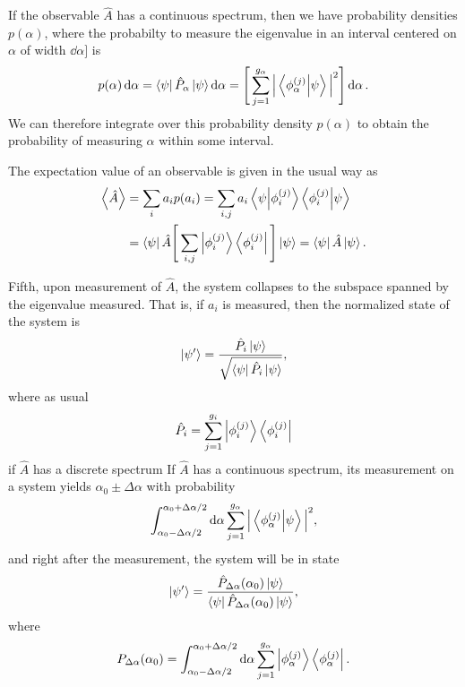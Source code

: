 If the observable $\hat{A}$ has a continuous spectrum, then we have probability densities $p(\alpha)$, where the probabilty to measure the eigenvalue in an interval centered on $\alpha$ of width $\dd{\alpha}]$ is 
\begin{align}
    p(\alpha) \dd{\alpha} = \bra{\psi} \hat{P}_{\alpha} \ket{\psi} \dd{\alpha} = \Bigg[ \sum_{j=1}^{g_{\alpha}} \Big| \bra{\phi_{\alpha}^{(j)}} \ket{\psi} \Big|^2 \Bigg] \dd{\alpha}
.\end{align}
We can therefore integrate over this probability density $p(\alpha)$ to obtain the probability of measuring $\alpha$ within some interval.

The expectation value of an observable is given in the usual way as
\begin{align}
    \expval{\hat{A}} &= \sum_{i} a_{i} p(a_{i}) = \sum_{i,j} a_{i} \bra{\psi} \ket{\phi_{i}^{(j)}} \bra{\phi_{i}^{(j)}} \ket{\psi} \nonumber \\
    &= \bra{\psi} \hat{A} \Bigg[ \sum_{i,j} \ket{\phi_{i}^{(j)}} \bra{\phi_{i}^{(j)}} \Bigg] \ket{\psi} = \bra{\psi} \hat{A} \ket{\psi}
.\end{align}

Fifth, upon measurement of $\hat{A}$, the system collapses to the subspace spanned by the eigenvalue measured.
That is, if $a_{i}$ is measured, then the normalized state of the system is
\begin{eqnarray}
    \ket{\psi'} = \frac{\hat{P}_{i} \ket{\psi}}{\sqrt{\bra{\psi} \hat{P}_{i} \ket{\psi}}}
,\end{eqnarray}
where as usual
\begin{eqnarray}
    \hat{P}_{i} = \sum_{j=1}^{g_{i}} \ket{\phi_{i}^{(j)}} \bra{\phi_{i}^{(j)}}
\end{eqnarray}
if $\hat{A}$ has a discrete spectrum
If $\hat{A}$ has a continuous spectrum, its measurement on a system yields $\alpha_0 \pm \Delta \alpha$ with probability
\begin{eqnarray}
    \int_{\alpha_0 - \Delta \alpha/2}^{\alpha_0 + \Delta \alpha/2} \dd{\alpha} \sum_{j=1}^{g_{\alpha}} \Big| \bra{\phi_{\alpha}^{(j)}}\ket{\psi} \Big|^2
,\end{eqnarray}
and right after the measurement, the system will be in state
\begin{eqnarray}
    \ket{\psi'} = \frac{\hat{P}_{\Delta \alpha}(\alpha_0) \ket{\psi}}{\bra{\psi} \hat{P}_{\Delta \alpha}(\alpha_0) \ket{\psi}}
,\end{eqnarray}
where
\begin{eqnarray}
    P_{\Delta \alpha}(\alpha_0) = \int_{\alpha_0 - \Delta \alpha/2}^{\alpha_0 + \Delta \alpha / 2} \dd{\alpha} \sum_{j=1}^{g_{\alpha}} \ket{\phi_{\alpha}^{(j)}} \bra{\phi_{\alpha}^{(j)}}
.\end{eqnarray}

